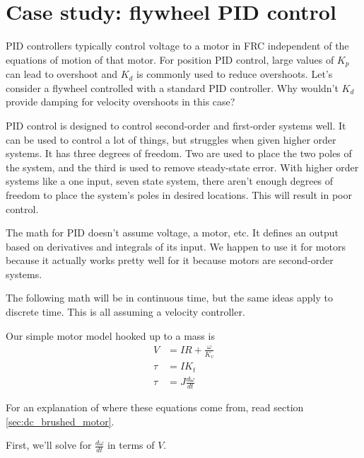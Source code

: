 \section{Case study: flywheel PID control}

PID controllers typically control voltage to a motor in FRC independent of the
equations of motion of that motor. For position PID control, large values of
$K_p$ can lead to overshoot and $K_d$ is commonly used to reduce overshoots.
Let's consider a flywheel controlled with a standard PID controller. Why
wouldn't $K_d$ provide damping for velocity overshoots in this case?

PID control is designed to control second-order and first-order \glspl{system}
well. It can be used to control a lot of things, but struggles when given higher
order \glspl{system}. It has three degrees of freedom. Two are used to place the
two poles of the \gls{system}, and the third is used to remove steady-state
error. With higher order \glspl{system} like a one input, seven \gls{state}
\gls{system}, there aren't enough degrees of freedom to place the \gls{system}'s
poles in desired locations. This will result in poor control.

The math for PID doesn't assume voltage, a motor, etc. It defines an output
based on derivatives and integrals of its input. We happen to use it for motors
because it actually works pretty well for it because motors are second-order
\glspl{system}.

The following math will be in continuous time, but the same ideas apply to
discrete time. This is all assuming a velocity controller.

Our simple motor model hooked up to a mass is
\begin{align}
  V &= IR + \frac{\omega}{K_v} \label{eq:steady-state_error_ss_flywheel_1} \\
  \tau &= I K_t \label{eq:steady-state_error_ss_flywheel_2} \\
  \tau &= J \frac{d\omega}{dt} \label{eq:steady-state_error_ss_flywheel_3}
\end{align}

For an explanation of where these equations come from, read section
\ref{sec:dc_brushed_motor}.

First, we'll solve for $\frac{d\omega}{dt}$ in terms of $V$.

